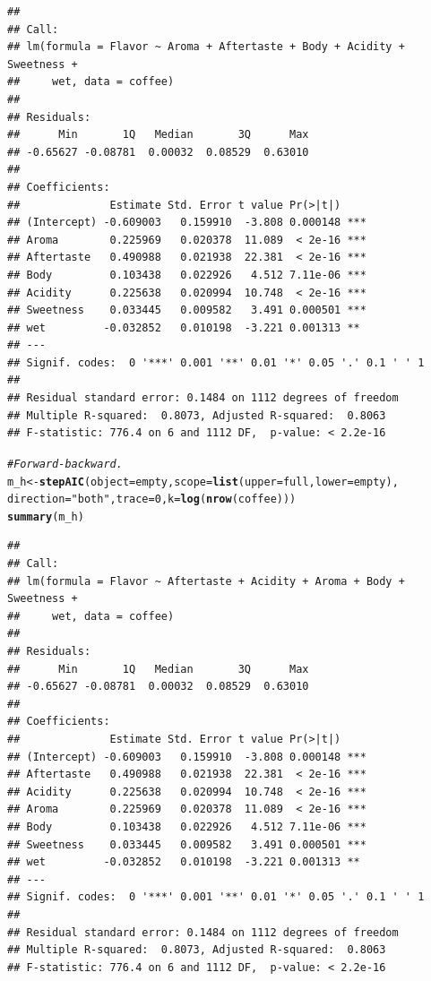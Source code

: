 \documentclass[oneside]{book}\usepackage[]{graphicx}\usepackage[dvipsnames,table,xcdraw]{xcolor}
\makeatletter
\newcommand{\hlnum}[1]{\textcolor[rgb]{0.686,0.059,0.569}{#1}}%
\newcommand{\hlstr}[1]{\textcolor[rgb]{0.192,0.494,0.8}{#1}}%
\newcommand{\hlcom}[1]{\textcolor[rgb]{0.678,0.584,0.686}{\textit{#1}}}%
\newcommand{\hlstd}[1]{\textcolor[rgb]{0.345,0.345,0.345}{#1}}%
\newcommand{\hlkwb}[1]{\textcolor[rgb]{0.69,0.353,0.396}{#1}}%
\newcommand{\hlkwc}[1]{\textcolor[rgb]{0.333,0.667,0.333}{#1}}%
\newcommand{\hlkwd}[1]{\textcolor[rgb]{0.737,0.353,0.396}{\textbf{#1}}}%
\newenvironment{kframe}{%
 \def\at@end@of@kframe{}%
 \ifinner\ifhmode%
  \def\at@end@of@kframe{\end{minipage}}%
  \begin{minipage}{\columnwidth}%
 \fi\fi%
 \def\FrameCommand##1{\hskip\@totalleftmargin \hskip-\fboxsep
 \colorbox{shadecolor}{##1}\hskip-\fboxsep
     \hskip-\linewidth \hskip-\@totalleftmargin \hskip\columnwidth}%
 \MakeFramed {\advance\hsize-\width
   \@totalleftmargin\z@ \linewidth\hsize
   \@setminipage}}%
 {\par\unskip\endMakeFramed%
 \at@end@of@kframe}
\newenvironment{knitrout}{}{} %
\makeatother
\begin{document}
\begin{knitrout}
\begin{kframe}
\begin{verbatim}
## 
## Call:
## lm(formula = Flavor ~ Aroma + Aftertaste + Body + Acidity + Sweetness + 
##     wet, data = coffee)
## 
## Residuals:
##      Min       1Q   Median       3Q      Max 
## -0.65627 -0.08781  0.00032  0.08529  0.63010 
## 
## Coefficients:
##              Estimate Std. Error t value Pr(>|t|)    
## (Intercept) -0.609003   0.159910  -3.808 0.000148 ***
## Aroma        0.225969   0.020378  11.089  < 2e-16 ***
## Aftertaste   0.490988   0.021938  22.381  < 2e-16 ***
## Body         0.103438   0.022926   4.512 7.11e-06 ***
## Acidity      0.225638   0.020994  10.748  < 2e-16 ***
## Sweetness    0.033445   0.009582   3.491 0.000501 ***
## wet         -0.032852   0.010198  -3.221 0.001313 ** 
## ---
## Signif. codes:  0 '***' 0.001 '**' 0.01 '*' 0.05 '.' 0.1 ' ' 1
## 
## Residual standard error: 0.1484 on 1112 degrees of freedom
## Multiple R-squared:  0.8073,	Adjusted R-squared:  0.8063 
## F-statistic: 776.4 on 6 and 1112 DF,  p-value: < 2.2e-16
\end{verbatim}
\begin{alltt}
\hlcom{# Forward-backward.}
\hlstd{m_h} \hlkwb{<-} \hlkwd{stepAIC}\hlstd{(}\hlkwc{object} \hlstd{= empty,} \hlkwc{scope} \hlstd{=} \hlkwd{list}\hlstd{(}\hlkwc{upper} \hlstd{= full,} \hlkwc{lower} \hlstd{= empty),}
  \hlkwc{direction} \hlstd{=} \hlstr{"both"}\hlstd{,} \hlkwc{trace} \hlstd{=} \hlnum{0}\hlstd{,} \hlkwc{k} \hlstd{=} \hlkwd{log}\hlstd{(}\hlkwd{nrow}\hlstd{(coffee)))}
\hlkwd{summary}\hlstd{(m_h)}
\end{alltt}
\begin{verbatim}
## 
## Call:
## lm(formula = Flavor ~ Aftertaste + Acidity + Aroma + Body + Sweetness + 
##     wet, data = coffee)
## 
## Residuals:
##      Min       1Q   Median       3Q      Max 
## -0.65627 -0.08781  0.00032  0.08529  0.63010 
## 
## Coefficients:
##              Estimate Std. Error t value Pr(>|t|)    
## (Intercept) -0.609003   0.159910  -3.808 0.000148 ***
## Aftertaste   0.490988   0.021938  22.381  < 2e-16 ***
## Acidity      0.225638   0.020994  10.748  < 2e-16 ***
## Aroma        0.225969   0.020378  11.089  < 2e-16 ***
## Body         0.103438   0.022926   4.512 7.11e-06 ***
## Sweetness    0.033445   0.009582   3.491 0.000501 ***
## wet         -0.032852   0.010198  -3.221 0.001313 ** 
## ---
## Signif. codes:  0 '***' 0.001 '**' 0.01 '*' 0.05 '.' 0.1 ' ' 1
## 
## Residual standard error: 0.1484 on 1112 degrees of freedom
## Multiple R-squared:  0.8073,	Adjusted R-squared:  0.8063 
## F-statistic: 776.4 on 6 and 1112 DF,  p-value: < 2.2e-16
\end{verbatim}
\end{kframe}
\end{knitrout}
\end{document}

